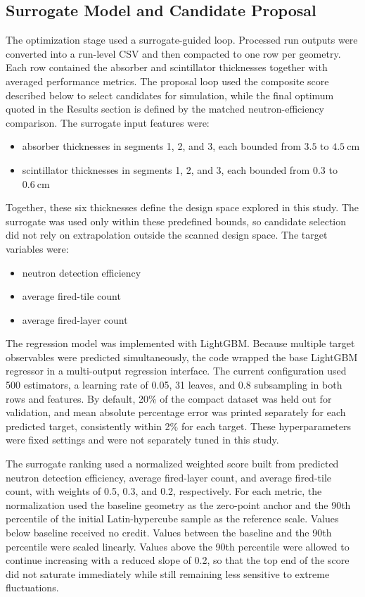 \subsection{Surrogate Model and Candidate Proposal}

\noindent The optimization stage used a surrogate-guided loop. Processed run outputs were converted into a run-level CSV and then compacted to one row per geometry. Each row
contained the absorber and scintillator thicknesses together with averaged performance metrics. The proposal loop used the composite score described below to select candidates for 
simulation, while the final optimum quoted in the Results section is defined by the matched neutron-efficiency comparison. The surrogate input features were:
\begin{itemize}[nosep]
    \item absorber thicknesses in segments 1, 2, and 3, each bounded from $3.5$ to $4.5~\mathrm{cm}$
    \item scintillator thicknesses in segments 1, 2, and 3, each bounded from $0.3$ to $0.6~\mathrm{cm}$
\end{itemize}
Together, these six thicknesses define the design space explored in this study. The surrogate was used only within these predefined bounds, so candidate selection did not rely on 
extrapolation outside the scanned design space. The target variables were:
\begin{itemize}[nosep]
    \item neutron detection efficiency
    \item average fired-tile count
    \item average fired-layer count
\end{itemize}

\noindent The regression model was implemented with LightGBM\cite{Ke:2017lightgbm}. Because multiple target observables were predicted simultaneously, the code wrapped the base LightGBM regressor in a
multi-output regression interface. The current configuration used 500 estimators, a learning rate of 0.05, 31 leaves, and 0.8 subsampling in both rows and features. By default,
20\% of the compact dataset was held out for validation, and mean absolute percentage error was printed separately for each predicted target, consistently within 2\% for each target. These
hyperparameters were fixed settings and were not separately tuned in this study.

\noindent The surrogate ranking used a normalized weighted score built from predicted neutron detection efficiency, average fired-layer count, and average fired-tile count, with weights of
0.5, 0.3, and 0.2, respectively. For each metric, the normalization used the baseline geometry as the zero-point anchor and the 90th percentile of the initial Latin-hypercube sample
as the reference scale. Values below baseline received no credit. Values between the baseline and the 90th percentile were scaled linearly. Values above the 90th percentile were allowed
to continue increasing with a reduced slope of 0.2, so that the top end of the score did not saturate immediately while still remaining less sensitive to extreme fluctuations.


